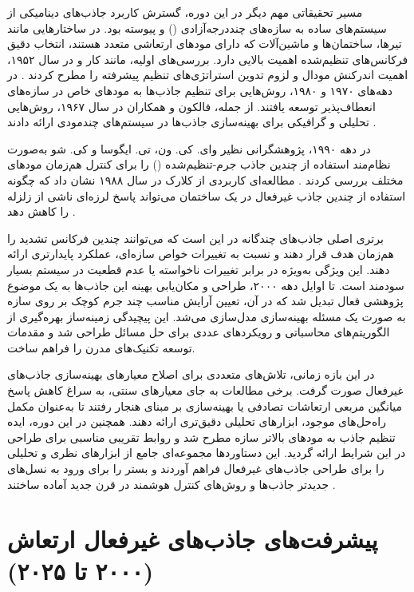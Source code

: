 مسیر تحقیقاتی مهم دیگر در این دوره، گسترش کاربرد جاذب‌های دینامیکی از سیستم‌های ساده به سازه‌های چنددرجه‌آزادی () و پیوسته بود. در ساختارهایی مانند تیرها، ساختمان‌ها و ماشین‌آلات که دارای مودهای ارتعاشی متعدد هستند، انتخاب دقیق فرکانس‌های تنظیم‌شده اهمیت بالایی دارد. بررسی‌های اولیه، مانند کار  و  در سال ۱۹۵۲، اهمیت اندرکنش مودال و لزوم تدوین استراتژی‌های تنظیم پیشرفته را مطرح کردند \cite{bishop1952problem}. در دهه‌های ۱۹۷۰ و ۱۹۸۰، روش‌هایی برای تنظیم جاذب‌ها به مودهای خاص در سازه‌های انعطاف‌پذیر توسعه یافتند. از جمله، فالکون و همکاران در سال ۱۹۶۷، روش‌هایی تحلیلی و گرافیکی برای بهینه‌سازی جاذب‌ها در سیستم‌های چندمودی ارائه دادند \cite{falcon1967optimization}.

در دهه ۱۹۹۰، پژوهشگرانی نظیر وای. کی. ون، تی. ایگوسا و کی. شو به‌صورت نظام‌مند استفاده از چندین جاذب جرم-تنظیم‌شده () را برای کنترل هم‌زمان مودهای مختلف بررسی کردند \cite{igusa1994vibration}. مطالعه‌ای کاربردی از کلارک در سال ۱۹۸۸ نشان داد که چگونه استفاده از چندین جاذب غیرفعال در یک ساختمان می‌تواند پاسخ لرزه‌ای ناشی از زلزله را کاهش دهد \cite{clark1988multiple}.

برتری اصلی جاذب‌های چندگانه در این است که می‌توانند چندین فرکانس تشدید را هم‌زمان هدف قرار دهند و نسبت به تغییرات خواص سازه‌ای، عملکرد پایدارتری ارائه دهند. این ویژگی به‌ویژه در برابر تغییرات ناخواسته یا عدم قطعیت در سیستم بسیار سودمند است. تا اوایل دهه ۲۰۰۰، طراحی و مکان‌یابی بهینه این جاذب‌ها به یک موضوع پژوهشی فعال تبدیل شد که در آن، تعیین آرایش مناسب چند جرم کوچک بر روی سازه به صورت یک مسئله بهینه‌سازی مدل‌سازی می‌شد. این پیچیدگی زمینه‌ساز بهره‌گیری از الگوریتم‌های محاسباتی و رویکردهای عددی برای حل مسائل طراحی شد و مقدمات توسعه تکنیک‌های مدرن را فراهم ساخت.

در این بازه زمانی، تلاش‌های متعددی برای اصلاح معیارهای بهینه‌سازی جاذب‌های غیرفعال صورت گرفت. برخی مطالعات به جای معیارهای سنتی، به سراغ کاهش پاسخ میانگین مربعی ارتعاشات تصادفی یا بهینه‌سازی بر مبنای هنجار  رفتند تا به‌عنوان مکمل راه‌حل‌های  موجود، ابزارهای تحلیلی دقیق‌تری ارائه دهند. همچنین در این دوره، ایده تنظیم جاذب به مودهای بالاتر سازه مطرح شد و روابط تقریبی مناسبی برای طراحی در این شرایط ارائه گردید. این دستاوردها مجموعه‌ای جامع از ابزارهای نظری و تحلیلی را برای طراحی جاذب‌های غیرفعال فراهم آوردند و بستر را برای ورود به نسل‌های جدیدتر جاذب‌ها و روش‌های کنترل هوشمند در قرن جدید آماده ساختند \cite{sadek1997method, tsai1993optimum, asami2002h, asami2002analytical}.


\section{پیشرفت‌های جاذب‌های غیرفعال ارتعاش (۲۰۰۰ تا ۲۰۲۵)}

